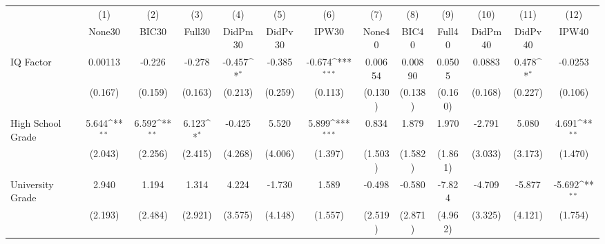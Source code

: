 {
\def\sym#1{\ifmmode^{#1}\else\(^{#1}\)\fi}
\begin{tabular}{l*{12}{c}}
\toprule
            &\multicolumn{1}{c}{(1)}&\multicolumn{1}{c}{(2)}&\multicolumn{1}{c}{(3)}&\multicolumn{1}{c}{(4)}&\multicolumn{1}{c}{(5)}&\multicolumn{1}{c}{(6)}&\multicolumn{1}{c}{(7)}&\multicolumn{1}{c}{(8)}&\multicolumn{1}{c}{(9)}&\multicolumn{1}{c}{(10)}&\multicolumn{1}{c}{(11)}&\multicolumn{1}{c}{(12)}\\
            &\multicolumn{1}{c}{None30}&\multicolumn{1}{c}{BIC30}&\multicolumn{1}{c}{Full30}&\multicolumn{1}{c}{DidPm30}&\multicolumn{1}{c}{DidPv30}&\multicolumn{1}{c}{IPW30}&\multicolumn{1}{c}{None40}&\multicolumn{1}{c}{BIC40}&\multicolumn{1}{c}{Full40}&\multicolumn{1}{c}{DidPm40}&\multicolumn{1}{c}{DidPv40}&\multicolumn{1}{c}{IPW40}\\
\midrule
IQ Factor   &     0.00113         &      -0.226         &      -0.278         &      -0.457\sym{*}  &      -0.385         &      -0.674\sym{***}&     0.00654         &     0.00890         &      0.0505         &      0.0883         &       0.478\sym{*}  &     -0.0253         \\
            &     (0.167)         &     (0.159)         &     (0.163)         &     (0.213)         &     (0.259)         &     (0.113)         &     (0.130)         &     (0.138)         &     (0.160)         &     (0.168)         &     (0.227)         &     (0.106)         \\
\addlinespace
High School Grade&       5.644\sym{**} &       6.592\sym{**} &       6.123\sym{*}  &      -0.425         &       5.520         &       5.899\sym{***}&       0.834         &       1.879         &       1.970         &      -2.791         &       5.080         &       4.691\sym{**} \\
            &     (2.043)         &     (2.256)         &     (2.415)         &     (4.268)         &     (4.006)         &     (1.397)         &     (1.503)         &     (1.582)         &     (1.861)         &     (3.033)         &     (3.173)         &     (1.470)         \\
\addlinespace
University Grade&       2.940         &       1.194         &       1.314         &       4.224         &      -1.730         &       1.589         &      -0.498         &      -0.580         &      -7.824         &      -4.709         &      -5.877         &      -5.692\sym{**} \\
            &     (2.193)         &     (2.484)         &     (2.921)         &     (3.575)         &     (4.148)         &     (1.557)         &     (2.519)         &     (2.871)         &     (4.962)         &     (3.325)         &     (4.121)         &     (1.754)         \\

\end{tabular}}
